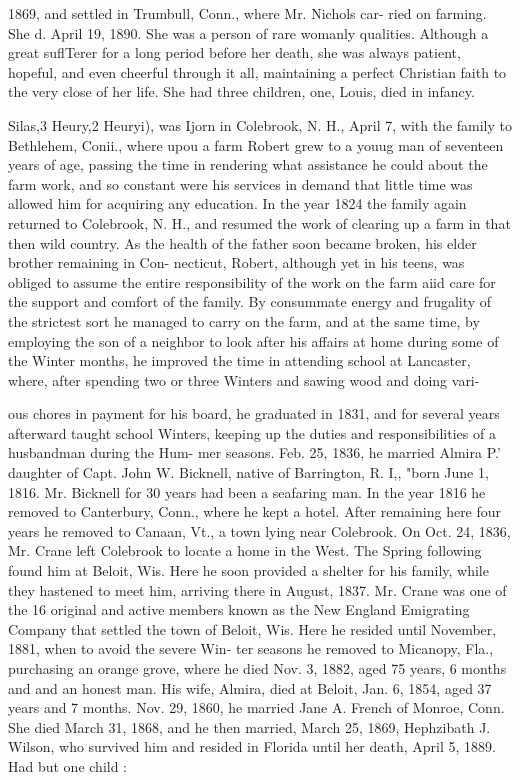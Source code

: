 \documentclass{book}
\begin{document}
1869, and settled in Trumbull, Conn., where Mr. Nichols car- 
ried on farming. She d. April 19, 1890. She was a person of 
rare womanly qualities. Although a great suflTerer for a long 
period before her death, she was always patient, hopeful, and 
even cheerful through it all, maintaining a perfect Christian 
faith to the very close of her life. She had three children, 
one, Louis, died in infancy. 



Silas,3 Heury,2 Heuryi), was Ijorn in Colebrook, N. H., April 7, 
with the family to Bethlehem, Conii., where upou a farm Robert 
grew to a youug man of seventeen years of age, passing the time 
in rendering what assistance he could about the farm work, and 
so constant were his services in demand that little time was allowed 
him for acquiring any education. In the year 1824 the family 
again returned to Colebrook, N. H., and resumed the work of 
clearing up a farm in that then wild country. As the health of the 
father soon became broken, his elder brother remaining in Con- 
necticut, Robert, although yet in his teens, was obliged to assume 
the entire responsibility of the work on the farm aiid care for the 
support and comfort of the family. By consummate energy and 
frugality of the strictest sort he managed to carry on the farm, 
and at the same time, by employing the son of a neighbor to look 
after his affairs at home during some of the Winter months, he 
improved the time in attending school at Lancaster, where, after 
spending two or three Winters and sawing wood and doing vari- 




ous chores in payment for his board, he graduated in 1831, and 
for several years afterward taught school Winters, keeping up 
the duties and responsibilities of a husbandman during the Hum- 
mer seasons. Feb. 25, 1836, he married Almira P.' daughter 
of Capt. John W. Bicknell, native of Barrington, R. I,, "born 
June 1, 1816. Mr. Bicknell for 30 years had been a seafaring 
man. In the year 1816 he removed to Canterbury, Conn., 
where he kept a hotel. After remaining here four years he 
removed to Canaan, Vt., a town lying near Colebrook. On 
Oct. 24, 1836, Mr. Crane left Colebrook to locate a home in the 
West. The Spring following found him at Beloit, Wis. Here 
he soon provided a shelter for his family, while they hastened to 
meet him, arriving there in August, 1837. Mr. Crane was one 
of the 16 original and active members known as the New England 
Emigrating Company that settled the town of Beloit, Wis. Here 
he resided until November, 1881, when to avoid the severe Win- 
ter seasons he removed to Micanopy, Fla., purchasing an orange 
grove, where he died Nov. 3, 1882, aged 75 years, 6 months and 
and an honest man. His wife, Almira, died at Beloit, Jan. 6, 
1854, aged 37 years and 7 months. Nov. 29, 1860, he married 
Jane A. French of Monroe, Conn. She died March 31, 1868, 
and he then married, March 25, 1869, Hephzibath J. Wilson, 
who survived him and resided in Florida until her death, April 
5, 1889. Had but one child : 
\end{document}
